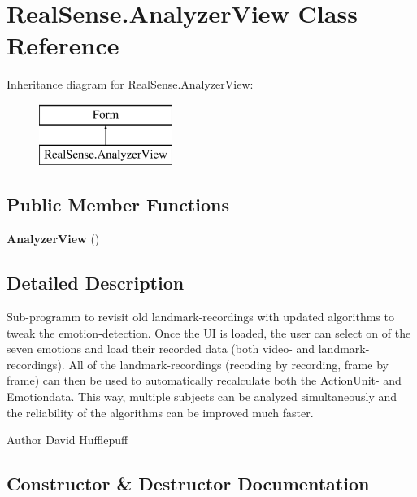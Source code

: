 \section{Real\+Sense.\+Analyzer\+View Class Reference}
\label{class_real_sense_1_1_analyzer_view}
Inheritance diagram for Real\+Sense.\+Analyzer\+View\+:\begin{figure}[H]
\begin{center}
\leavevmode
\includegraphics[height=2.000000cm]{class_real_sense_1_1_analyzer_view}
\end{center}
\end{figure}
\subsection*{Public Member Functions}
\begin{DoxyCompactItemize}
\item 
\textbf{ Analyzer\+View} ()
\end{DoxyCompactItemize}


\subsection{Detailed Description}
Sub-\/programm to revisit old landmark-\/recordings with updated algorithms to tweak the emotion-\/detection. Once the UI is loaded, the user can select on of the seven emotions and load their recorded data (both video-\/ and landmark-\/recordings). All of the landmark-\/recordings (recoding by recording, frame by frame) can then be used to automatically recalculate both the Action\+Unit-\/ and Emotiondata. This way, multiple subjects can be analyzed simultaneously and the reliability of the algorithms can be improved much faster. \begin{DoxyAuthor}{Author}
David  Hufflepuff 
\end{DoxyAuthor}


\subsection{Constructor \& Destructor Documentation}
\mbox{\label{class_real_sense_1_1_analyzer_view_ae982969308d52738e20d686cd24b88e8}} 
